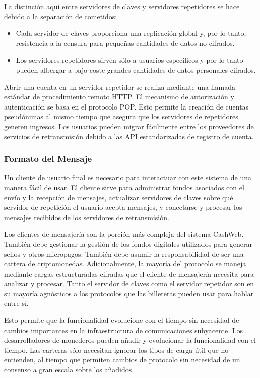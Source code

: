 \documentclass{article}
\begin{document}
La distinción aquí entre servidores de claves y servidores repetidores se hace debido a la separación de cometidos:
\begin{itemize}
  \item Cada servidor de claves proporciona una replicación global y, por lo tanto, resistencia a la censura para pequeñas cantidades de datos no cifrados.
  \item Los servidores repetidores sirven sólo a usuarios específicos y por lo tanto pueden albergar a bajo coste grandes cantidades de datos personales cifrados.
\end{itemize}

Abrir una cuenta en un servidor repetidor se realiza mediante una llamada estándar de procedimiento remoto HTTP. El mecanismo de autorización y autenticación se basa en el protocolo POP. Esto permite la creación de cuentas pseudónimas al mismo tiempo que asegura que los servidores de repetidores generen ingresos. Los usuarios pueden migrar fácilmente entre los proveedores de servicios de retransmisión debido a las API estandarizadas de registro de cuenta.

\subsubsection{Formato del Mensaje}

Un cliente de usuario final es necesario para interactuar con este sistema de una manera fácil de usar. El cliente sirve para administrar fondos asociados con el envío y la recepción de mensajes, actualizar servidores de claves sobre qué servidor de repetición el usuario acepta mensajes, y conectarse y procesar los mensajes recibidos de los servidores de retransmisión.

Los clientes de mensajería son la porción más compleja del sistema CashWeb. También debe gestionar la gestión de los fondos digitales utilizados para generar sellos y otros micropagos. También debe asumir la responsabilidad de ser una cartera de criptomonedas. Adicionalmente, la mayoría del protocolo se maneja mediante cargas estructuradas cifradas que el cliente de mensajería necesita para analizar y procesar. Tanto el servidor de claves como el servidor repetidor son en su mayoría agnósticos a los protocolos que las billeteras pueden usar para hablar entre sí.

Esto permite que la funcionalidad evolucione con el tiempo sin necesidad de cambios importantes en la infraestructura de comunicaciones subyacente. Los desarrolladores de monederos pueden añadir y evolucionar la funcionalidad con el tiempo. Las carteras sólo necesitan ignorar los tipos de carga útil que no entienden, al tiempo que permiten cambios de protocolo sin necesidad de un consenso a gran escala sobre los añadidos.
\end{document}
